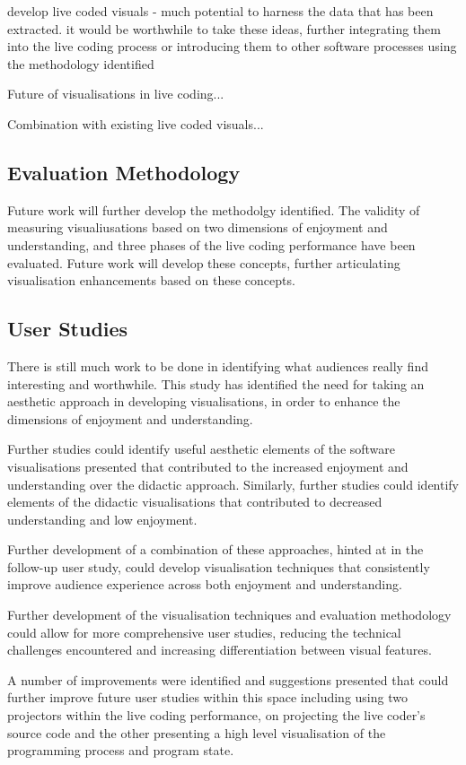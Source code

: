 develop live coded visuals - much potential to harness the data that has been extracted. it would be worthwhile to take these ideas, further integrating them into the live coding process or introducing them to other software processes using the methodology identified

Future of visualisations in live coding...

Combination with existing live coded visuals...

\subsection{Evaluation Methodology}

Future work will further develop the methodolgy identified. The validity of measuring visualiusations based on two dimensions of enjoyment and understanding, and three phases of the live coding performance have been evaluated. Future work will develop these concepts, further articulating visualisation enhancements based on these concepts. 

\subsection{User Studies}

There is still much work to be done in identifying what audiences really find interesting and worthwhile. This study has identified the need for taking an aesthetic approach in developing visualisations, in order to enhance the dimensions of enjoyment and understanding. 

Further studies could identify useful aesthetic elements of the software visualisations presented that contributed to the increased enjoyment and understanding over the didactic approach. Similarly, further studies could identify elements of the didactic visualisations that contributed to decreased understanding and low enjoyment.

Further development of a combination of these approaches, hinted at in the follow-up user study, could develop visualisation techniques that consistently improve audience experience across both enjoyment and understanding.

Further development of the visualisation techniques and evaluation methodology could allow for more comprehensive user studies, reducing the technical challenges encountered and increasing differentiation between visual features.

A number of improvements were identified and suggestions presented that could further improve future user studies within this space including using two projectors within the live coding performance, on projecting the live coder's source code and the other presenting a high level visualisation of the programming process and program state.

